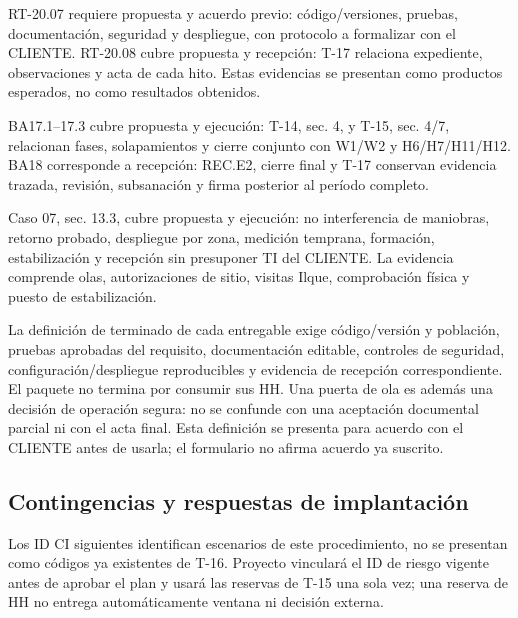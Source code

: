 RT-20.07 requiere propuesta y acuerdo previo: código/versiones, pruebas, documentación, seguridad y despliegue, con protocolo a formalizar con el CLIENTE. RT-20.08 cubre propuesta y recepción: T-17 relaciona expediente, observaciones y acta de cada hito. Estas evidencias se presentan como productos esperados, no como resultados obtenidos.

BA17.1--17.3 cubre propuesta y ejecución: T-14, sec. 4, y T-15, sec. 4/7, relacionan fases, solapamientos y cierre conjunto con W1/W2 y H6/H7/H11/H12. BA18 corresponde a recepción: REC.E2, cierre final y T-17 conservan evidencia trazada, revisión, subsanación y firma posterior al período completo.

Caso 07, sec. 13.3, cubre propuesta y ejecución: no interferencia de maniobras, retorno probado, despliegue por zona, medición temprana, formación, estabilización y recepción sin presuponer TI del CLIENTE. La evidencia comprende olas, autorizaciones de sitio, visitas Ilque, comprobación física y puesto de estabilización.


La definición de terminado de cada entregable exige código/versión y población, pruebas aprobadas del requisito, documentación editable, controles de seguridad, configuración/despliegue reproducibles y evidencia de recepción correspondiente. El paquete no termina por consumir sus HH. Una puerta de ola es además una decisión de operación segura: no se confunde con una aceptación documental parcial ni con el acta final. Esta definición se presenta para acuerdo con el CLIENTE antes de usarla; el formulario no afirma acuerdo ya suscrito.

\subsection{Contingencias y respuestas de implantación}
Los ID CI siguientes identifican escenarios de este procedimiento, no se presentan como códigos ya existentes de T-16. Proyecto vinculará el ID de riesgo vigente antes de aprobar el plan y usará las reservas de T-15 una sola vez; una reserva de HH no entrega automáticamente ventana ni decisión externa.

